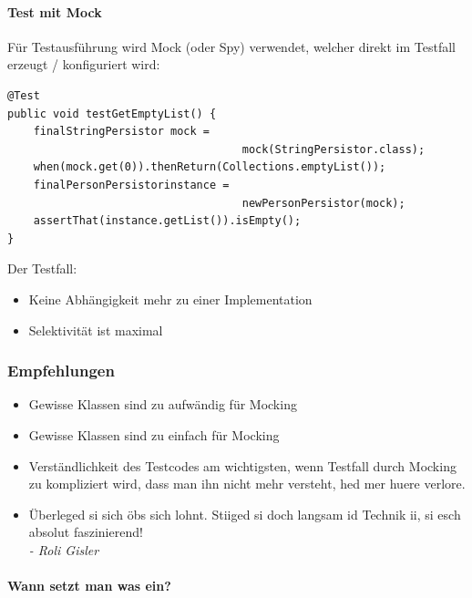 \documentclass[a4paper]{article}
\begin{document}
		\paragraph{Test mit Mock}
		
			Für Testausführung wird Mock (oder Spy) verwendet, welcher direkt im Testfall erzeugt / konfiguriert wird:
			
			\begin{lstlisting}
@Test
public void testGetEmptyList() {
	finalStringPersistor mock = 
									mock(StringPersistor.class);
	when(mock.get(0)).thenReturn(Collections.emptyList());
	finalPersonPersistorinstance = 
									newPersonPersistor(mock);
	assertThat(instance.getList()).isEmpty();
}
			\end{lstlisting}
			\noindent
			Der Testfall:
			\begin{itemize}
				\item Keine Abhängigkeit mehr zu einer Implementation
				\item Selektivität ist maximal
			\end{itemize}
				
		\newpage
		
		\subsubsection{Empfehlungen}
		
		\begin{itemize}
			\item Gewisse Klassen sind zu aufwändig für Mocking
			\item Gewisse Klassen sind zu einfach für Mocking
			\item Verständlichkeit des Testcodes am wichtigsten, wenn Testfall durch Mocking zu kompliziert wird, dass man ihn nicht mehr versteht, hed mer huere verlore.
			\item Überleged si sich öbs sich lohnt. Stiiged si doch langsam id Technik ii, si esch absolut faszinierend!\\
			\textit{- Roli Gisler}
		\end{itemize}
	
			\paragraph{Wann setzt man was ein?}
			
\end{document}
